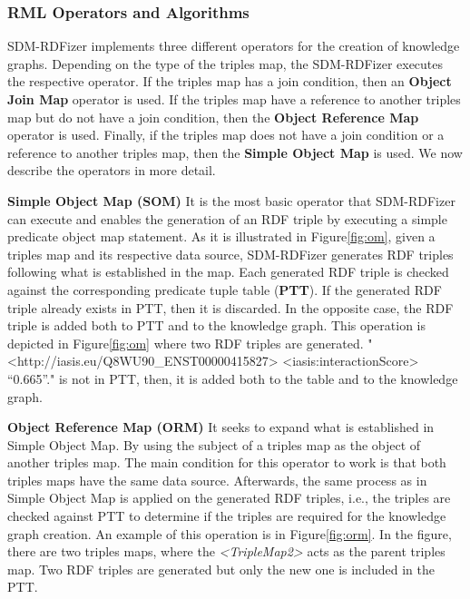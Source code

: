 \subsubsection{RML Operators and Algorithms}
\label{operators}
SDM-RDFizer implements three different operators for the creation of knowledge graphs. Depending on the type of the triples map, the SDM-RDFizer executes the respective operator. If the triples map has a join condition, then an \textbf{Object Join Map} operator is used. If the triples map have a reference to another triples map but do not have a join condition, then the \textbf{Object Reference Map} operator is used. Finally, if the triples map does not have a join condition or a reference to another triples map, then the \textbf{Simple Object Map} is used. We now describe the operators in more detail.

\noindent\textbf{Simple Object Map (SOM)}
 It is the most basic operator that SDM-RDFizer can execute and enables the generation of an RDF triple by executing a simple predicate object map statement. As it is illustrated in Figure\autoref{fig:om}, given a triples map and its respective data source, SDM-RDFizer generates RDF triples following what is established in the map. Each generated RDF triple is checked against the corresponding predicate tuple table (\textbf{PTT}). If the generated RDF triple already exists in PTT, then it is discarded. In the opposite case, the RDF triple is added both to PTT and to the knowledge graph. This operation is depicted in Figure\autoref{fig:om} where two RDF triples are generated. "<http://iasis.eu/Q8WU90\_ENST00000415827> <iasis:interactionScore> “0.665”." is not in PTT, then, it is added both to the table and to the knowledge graph.  

\noindent\textbf{Object Reference Map (ORM)}
It seeks to expand what is established in Simple Object Map. By using the subject of a triples map as the object of another triples map. The main condition for this operator to work is that both triples maps have the same data source. Afterwards, the same process as in Simple Object Map is applied on the generated RDF triples, i.e., the triples are checked against PTT to determine if the triples are required for the knowledge graph creation. An example of this operation is in Figure\autoref{fig:orm}. In the figure, there are two triples maps, where the \textit{<TripleMap2>} acts as the parent triples map. Two RDF triples are generated but only the new one is included in the PTT. 


